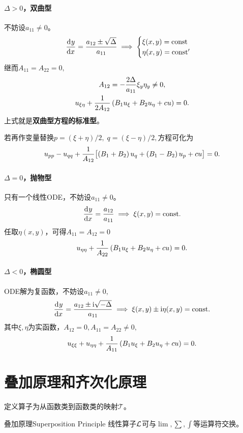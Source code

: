 \paragraph{$\Delta>0$，双曲型}不妨设$a_{11}\neq 0$。
\begin{align}
	\frac{\mathrm{d}^{{}}y}{\mathrm{d}{x}^{{}}}=\frac{a_{12}\pm\sqrt\Delta}{a_{11}}\implies
	\begin{cases}
		\xi(x,y)=\mathrm{const} \\
		\eta(x,y)=\mathrm{const}'
	\end{cases}
\end{align}
继而$A_{11}=A_{22}=0,$
\begin{gather}\notag
	A_{12}=-\frac{2\Delta}{a_{11}}\xi_y\eta_y\neq 0,\\
	u_{\xi\eta}+\frac1{2A_{12}}\left(B_1u_\xi+B_2u_\eta+cu\right)=0.
\end{gather}
上式就是\textbf{双曲型方程的标准型}。

若再作变量替换$p=(\xi+\eta)/2,\;q=(\xi-\eta)/2,$方程可化为
\begin{align}
	u_{pp}-u_{qq}+\frac1{A_{12}}\bigl[\left(B_1+B_2\right)u_q+\left(B_1-B_2\right)u_p+cu\bigr]=0.
\end{align}
\paragraph{$\Delta=0$，抛物型}只有一个线性ODE，不妨设$a_{11}\neq 0$。
\begin{align}
	\frac{\mathrm{d}^{{}}y}{\mathrm{d}{x}^{{}}}=\frac{a_{12}}{a_{11}}\implies\xi(x,y)=\mathrm{const}.
\end{align}
任取$\eta(x,y)$，可得$A_{11}=A_{12}=0$
\begin{align}
	u_{\eta\eta}+\frac1{A_{22}}\left(B_1u_\xi+B_2u_\eta+cu\right)=0.
\end{align}
\paragraph{$\Delta<0$，椭圆型}ODE解为复函数，不妨设$a_{11}\neq 0,$
\begin{align}
	\frac{\mathrm{d}^{{}}y}{\mathrm{d}{x}^{{}}}=\frac{a_{12}\pm\mathrm{i}\sqrt{-\Delta}}{a_{11}}\implies \xi(x,y)\pm\mathrm{i}\eta(x,y)=\mathrm{const}.
\end{align}
其中$\xi,\eta$为实函数，$A_{12}=0,A_{11}=A_{22}\neq 0,$
\begin{align}
	u_{\xi\xi}+u_{\eta\eta}+\frac1{A_{11}}\left(B_1u_\xi+B_2u_\eta+cu\right)=0.
\end{align}
\section{叠加原理和齐次化原理}
定义算子为从函数类到函数类的映射$\mathcal T$。
\begin{theorem}{叠加原理}{Superposition Principle}
	线性算子$\mathcal L$可与$\textstyle\lim,\sum,\int$等运算符交换。%
\end{theorem}

